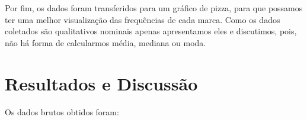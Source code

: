 \documentclass[
	12pt,				%
	oneside,			%
	a4paper,			%
	english,			%
	french,				%
	spanish,			%
	brazil,				%
	]{abntex2}
\begin{document}
Por fim, os dados foram transferidos para um gráfico de pizza, para que possamos ter uma melhor visualização das frequências de cada marca. Como os dados coletados são qualitativos nominais apenas apresentamos eles e discutimos, pois, não há forma de calcularmos média, mediana ou moda.






\newpage

\section[Resultados e Discussão]{Resultados e Discussão}
\pagestyle{fancy}

Os dados brutos obtidos foram:
\end{document}
